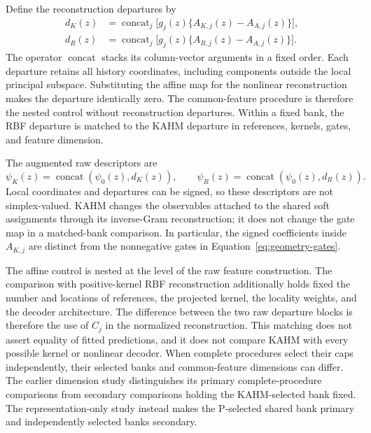 Define the reconstruction departures by
\begin{equation}
 \begin{split}
 d_K(z)&=\operatorname{concat}_{j}
       \bigl[g_j(z)\{A_{K,j}(z)-A_{A,j}(z)\}\bigr],\\
 d_R(z)&=\operatorname{concat}_{j}
       \bigl[g_j(z)\{A_{R,j}(z)-A_{A,j}(z)\}\bigr].
 \end{split}
 \label{eq:mechanism-main-departures}
\end{equation}
The operator $\operatorname{concat}$ stacks its column-vector arguments
in a fixed order. Each departure retains all history coordinates,
including components outside the local principal subspace. Substituting
the affine map for the nonlinear reconstruction makes the departure
identically zero. The common-feature procedure is therefore the nested
control without reconstruction departures. Within a fixed bank, the RBF
departure is matched to the KAHM departure in references, kernels, gates,
and feature dimension.

The augmented raw descriptors are
\begin{equation}
 \psi_K(z)=\operatorname{concat}(\psi_0(z),d_K(z)),\qquad
 \psi_R(z)=\operatorname{concat}(\psi_0(z),d_R(z)).
 \label{eq:geometry-enriched-observables}
\end{equation}
Local coordinates and departures can be signed, so these descriptors
are not simplex-valued. KAHM changes the observables attached to the
shared soft assignments through its inverse-Gram reconstruction; it
does not change the gate map in a matched-bank comparison. In particular,
the signed coefficients inside $A_{K,j}$ are distinct from the
nonnegative gates in Equation~\eqref{eq:geometry-gates}.


The affine control is nested at the level of the raw feature construction.
The comparison with positive-kernel RBF reconstruction additionally holds
fixed the number and locations of references, the projected kernel, the
locality weights, and the decoder architecture. The difference between
the two raw departure blocks is therefore the use of $C_j$ in the
normalized reconstruction. This matching does not assert equality of
fitted predictions, and it does not compare KAHM with every possible
kernel or nonlinear decoder. When complete procedures select their caps
independently, their selected banks and common-feature dimensions can
differ. The earlier dimension study distinguishes its primary complete-procedure
comparisons from secondary comparisons holding the KAHM-selected bank
fixed. The representation-only study instead makes the P-selected
shared bank primary and independently selected banks secondary.

